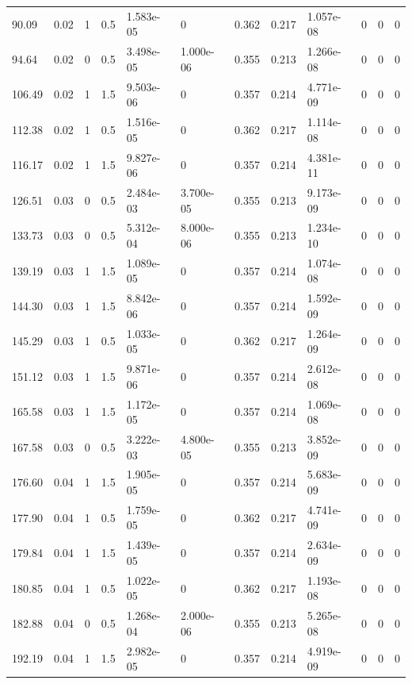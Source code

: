 \documentclass[preview]{standalone}
\begin{document}
{{\begin{tabular}{L{1.2cm}C{1.2cm} C{0.3cm}C{0.5cm} C{1.4cm}C{1.4cm} C{1.4cm}C{1.4cm} C{1.6cm}C{1.6cm} C{1.6cm}C{1.6cm}}
  90.09  &  0.02  & 1     & 0.5 &  1.583e-05  & 0  &  0.362&   0.217& 1.057e-08 & 0   &  0 & 0  \\ 
  94.64  &  0.02  & 0     & 0.5 &  3.498e-05  & 1.000e-06  &  0.355&   0.213& 1.266e-08 & 0   &  0 & 0  \\ 
  106.49  &  0.02  & 1     & 1.5 &  9.503e-06  & 0  &  0.357&   0.214& 4.771e-09 & 0   &  0 & 0  \\ 
  112.38  &  0.02  & 1     & 0.5 &  1.516e-05  & 0  &  0.362&   0.217& 1.114e-08 & 0   &  0 & 0  \\ 
  116.17  &  0.02  & 1     & 1.5 &  9.827e-06  & 0  &  0.357&   0.214& 4.381e-11 & 0   &  0 & 0  \\ 
  126.51  &  0.03  & 0     & 0.5 &  2.484e-03  & 3.700e-05  &  0.355&   0.213& 9.173e-09 & 0   &  0 & 0  \\ 
  133.73  &  0.03  & 0     & 0.5 &  5.312e-04  & 8.000e-06  &  0.355&   0.213& 1.234e-10 & 0   &  0 & 0  \\ 
  139.19  &  0.03  & 1     & 1.5 &  1.089e-05  & 0  &  0.357&   0.214& 1.074e-08 & 0   &  0 & 0  \\ 
  144.30  &  0.03  & 1     & 1.5 &  8.842e-06  & 0  &  0.357&   0.214& 1.592e-09 & 0   &  0 & 0  \\ 
  145.29  &  0.03  & 1     & 0.5 &  1.033e-05  & 0  &  0.362&   0.217& 1.264e-09 & 0   &  0 & 0  \\ 
  151.12  &  0.03  & 1     & 1.5 &  9.871e-06  & 0  &  0.357&   0.214& 2.612e-08 & 0   &  0 & 0  \\ 
  165.58  &  0.03  & 1     & 1.5 &  1.172e-05  & 0  &  0.357&   0.214& 1.069e-08 & 0   &  0 & 0  \\ 
  167.58  &  0.03  & 0     & 0.5 &  3.222e-03  & 4.800e-05  &  0.355&   0.213& 3.852e-09 & 0   &  0 & 0  \\ 
  176.60  &  0.04  & 1     & 1.5 &  1.905e-05  & 0  &  0.357&   0.214& 5.683e-09 & 0   &  0 & 0  \\ 
  177.90  &  0.04  & 1     & 0.5 &  1.759e-05  & 0  &  0.362&   0.217& 4.741e-09 & 0   &  0 & 0  \\ 
  179.84  &  0.04  & 1     & 1.5 &  1.439e-05  & 0  &  0.357&   0.214& 2.634e-09 & 0   &  0 & 0  \\ 
  180.85  &  0.04  & 1     & 0.5 &  1.022e-05  & 0  &  0.362&   0.217& 1.193e-08 & 0   &  0 & 0  \\ 
  182.88  &  0.04  & 0     & 0.5 &  1.268e-04  & 2.000e-06  &  0.355&   0.213& 5.265e-08 & 0   &  0 & 0  \\ 
  192.19  &  0.04  & 1     & 1.5 &  2.982e-05  & 0  &  0.357&   0.214& 4.919e-09 & 0   &  0 & 0  \\ 

\end{tabular}}}
\end{document}
